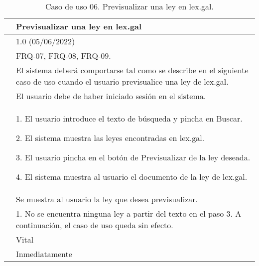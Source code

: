 \begin{table}[H]
\begin{center}
\begin{tabular}{|p{3cm}|p{10cm}|} \hline
\centering {\bf UC-06} & Previsualizar una ley en lex.gal  \\ \hline\hline
\centering {\bf Versión} & 1.0 (05/06/2022) \\ \hline
\centering {\bf Dependencias} & FRQ-07, FRQ-08, FRQ-09. \\ \hline
\centering {\bf Descripción} &  El sistema deberá comportarse tal como se describe en el siguiente caso de uso cuando el usuario previsualice una ley de lex.gal. \\ \hline
\centering {\bf Precondición} &  El usuario debe de haber iniciado sesión en el sistema. \\ \hline
\centering {\bf Secuencia normal} &  
1. El usuario introduce el texto de búsqueda y pincha en Buscar.

2. El sistema muestra las leyes encontradas en lex.gal.

3. El usuario pincha en el botón de Previsualizar de la ley deseada.

4. El sistema muestra al usuario el documento de la ley de lex.gal.
\\ \hline
\centering {\bf Postcondición} &  Se muestra al usuario la ley que desea previsualizar. \\ \hline
\centering {\bf Excepciones} & 
1. No se encuentra ninguna ley a partir del texto en el paso 3. A continuación, el caso de uso queda sin efecto.
\\ \hline
\centering {\bf Importancia} & Vital \\ \hline
\centering {\bf Urgencia} & Inmediatamente \\ \hline
\end{tabular}
\caption{Caso de uso 06. Previsualizar una ley en lex.gal.}
\label{enlaceUC6}
\end{center}
\end{table}

